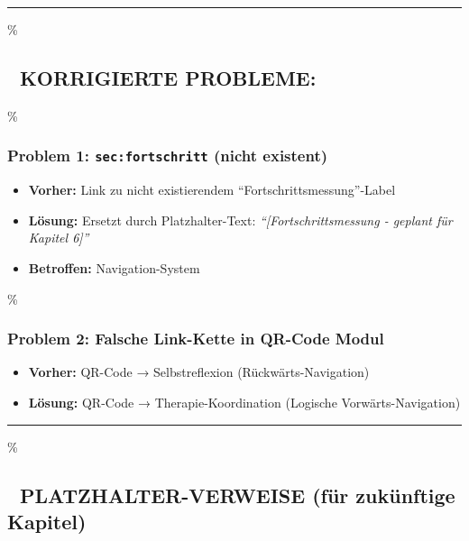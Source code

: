 \begin{center}\rule{0.5\linewidth}{0.5pt}\end{center}

\hypertarget{korrigierte-probleme}{\%
\subsection{\texorpdfstring{🔧 \textbf{KORRIGIERTE PROBLEME:}}{🔧 KORRIGIERTE PROBLEME:}}\label{korrigierte-probleme}}

\hypertarget{problem-1-secfortschritt-nicht-existent}{\%
\subsubsection{\texorpdfstring{\textbf{Problem 1: \texttt{sec:fortschritt} (nicht existent)}}{Problem 1: sec:fortschritt (nicht existent)}}\label{problem-1-secfortschritt-nicht-existent}}

\begin{itemize}
\tightlist
\item
  \textbf{Vorher:} Link zu nicht existierendem ``Fortschrittsmessung''-Label
\item
  \textbf{Lösung:} Ersetzt durch Platzhalter-Text: \emph{``{[}Fortschrittsmessung - geplant für Kapitel 6{]}''}
\item
  \textbf{Betroffen:} Navigation-System
\end{itemize}

\hypertarget{problem-2-falsche-link-kette-in-qr-code-modul}{\%
\subsubsection{\texorpdfstring{\textbf{Problem 2: Falsche Link-Kette in QR-Code Modul}}{Problem 2: Falsche Link-Kette in QR-Code Modul}}\label{problem-2-falsche-link-kette-in-qr-code-modul}}

\begin{itemize}
\tightlist
\item
  \textbf{Vorher:} QR-Code → Selbstreflexion (Rückwärts-Navigation)
\item
  \textbf{Lösung:} QR-Code → Therapie-Koordination (Logische Vorwärts-Navigation)
\end{itemize}

\begin{center}\rule{0.5\linewidth}{0.5pt}\end{center}

\hypertarget{platzhalter-verweise-fuxfcr-zukuxfcnftige-kapitel}{\%
\subsection{\texorpdfstring{📍 \textbf{PLATZHALTER-VERWEISE (für zukünftige Kapitel)}}{📍 PLATZHALTER-VERWEISE (für zukünftige Kapitel)}}\label{platzhalter-verweise-fuxfcr-zukuxfcnftige-kapitel}}

